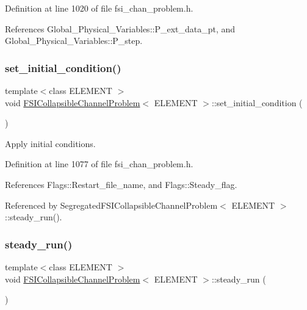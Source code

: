 Definition at line 1020 of file fsi\+\_\+chan\+\_\+problem.\+h.



References Global\+\_\+\+Physical\+\_\+\+Variables\+::\+P\+\_\+ext\+\_\+data\+\_\+pt, and Global\+\_\+\+Physical\+\_\+\+Variables\+::\+P\+\_\+step.

\mbox{\label{classFSICollapsibleChannelProblem_afdd6752cb134fd09ee8830158ed557b2}} 
\subsubsection{\texorpdfstring{set\+\_\+initial\+\_\+condition()}{set\_initial\_condition()}}
{\footnotesize\ttfamily template$<$class E\+L\+E\+M\+E\+NT $>$ \\
void \hyperlink{classFSICollapsibleChannelProblem}{F\+S\+I\+Collapsible\+Channel\+Problem}$<$ E\+L\+E\+M\+E\+NT $>$\+::set\+\_\+initial\+\_\+condition (\begin{DoxyParamCaption}{ }\end{DoxyParamCaption})}



Apply initial conditions. 



Definition at line 1077 of file fsi\+\_\+chan\+\_\+problem.\+h.



References Flags\+::\+Restart\+\_\+file\+\_\+name, and Flags\+::\+Steady\+\_\+flag.



Referenced by Segregated\+F\+S\+I\+Collapsible\+Channel\+Problem$<$ E\+L\+E\+M\+E\+N\+T $>$\+::steady\+\_\+run().

\mbox{\label{classFSICollapsibleChannelProblem_a299ba7d5819e7871eae7e331d1abab8b}} 
\subsubsection{\texorpdfstring{steady\+\_\+run()}{steady\_run()}}
{\footnotesize\ttfamily template$<$class E\+L\+E\+M\+E\+NT $>$ \\
void \hyperlink{classFSICollapsibleChannelProblem}{F\+S\+I\+Collapsible\+Channel\+Problem}$<$ E\+L\+E\+M\+E\+NT $>$\+::steady\+\_\+run (\begin{DoxyParamCaption}{ }\end{DoxyParamCaption})\hspace{0.3cm}{\ttfamily [virtual]}}



